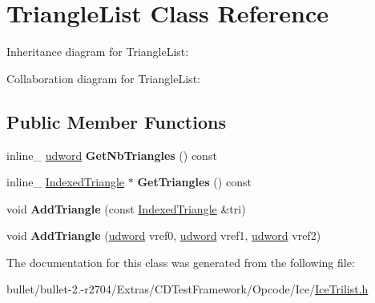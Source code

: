 \hypertarget{class_triangle_list}{\section{Triangle\+List Class Reference}
\label{class_triangle_list}
}


Inheritance diagram for Triangle\+List\+:


Collaboration diagram for Triangle\+List\+:
\subsection*{Public Member Functions}
\begin{DoxyCompactItemize}
\item 
\hypertarget{class_triangle_list_a6b7886829df695c13b006d5873040fe6}{inline\+\_\+ \hyperlink{_ice_types_8h_a44c6f1920ba5551225fb534f9d1a1733}{udword} {\bfseries Get\+Nb\+Triangles} () const }\label{class_triangle_list_a6b7886829df695c13b006d5873040fe6}

\item 
\hypertarget{class_triangle_list_ae10212d8eafffbd8b2c0b1762a2892d1}{inline\+\_\+ \hyperlink{class_indexed_triangle}{Indexed\+Triangle} $\ast$ {\bfseries Get\+Triangles} () const }\label{class_triangle_list_ae10212d8eafffbd8b2c0b1762a2892d1}

\item 
\hypertarget{class_triangle_list_a3fb434513c91f70ff3672a5265546ed2}{void {\bfseries Add\+Triangle} (const \hyperlink{class_indexed_triangle}{Indexed\+Triangle} \&tri)}\label{class_triangle_list_a3fb434513c91f70ff3672a5265546ed2}

\item 
\hypertarget{class_triangle_list_a31c95b8aabb23a054d814118a7a15c56}{void {\bfseries Add\+Triangle} (\hyperlink{_ice_types_8h_a44c6f1920ba5551225fb534f9d1a1733}{udword} vref0, \hyperlink{_ice_types_8h_a44c6f1920ba5551225fb534f9d1a1733}{udword} vref1, \hyperlink{_ice_types_8h_a44c6f1920ba5551225fb534f9d1a1733}{udword} vref2)}\label{class_triangle_list_a31c95b8aabb23a054d814118a7a15c56}

\end{DoxyCompactItemize}


The documentation for this class was generated from the following file\+:\begin{DoxyCompactItemize}
\item 
bullet/bullet-\/2.-\/r2704/\+Extras/\+C\+D\+Test\+Framework/\+Opcode/\+Ice/\hyperlink{_ice_trilist_8h}{Ice\+Trilist.\+h}\end{DoxyCompactItemize}
